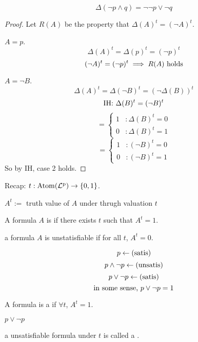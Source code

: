 \documentclass[12pt]{article}
\begin{document}
\bboxex
{}
\[\Delta(\neg p\wedge q)=\neg\neg p\vee\neg q\]
\ebox

\bboxproof
\begin{proof}
  Let \(R(A)\) be the property that \(\Delta(A)^t=(\neg A)^t\). 

   \(A=p\).
  \[\Delta(A)^t=\Delta(p)^t=(\neg p)^t\]
  \[(\neg A)^t=(\neg p)^t\implies R(A)\text{ holds}\]

   \(A=\neg B\).
  \[\Delta(A)^t=\Delta(\neg B)^t=(\neg\Delta(B))^t\]
  \[\text{IH: }\Delta(B)^t=(\neg B)^t\]
  \[=\begin{cases}
    1&:\Delta(B)^t=0\\
    0&:\Delta(B)^t=1
  \end{cases}
  \]
  \[=\begin{cases}
    1&:(\neg B)^t=0\\
    0&:(\neg B)^t=1
  \end{cases}\]
  So by IH, case 2 holds.
\end{proof}
\ebox

Recap: \(t:\mathrm{Atom}(\mathrm{\mathcal{L}^p_{}})\to\{0,1\}\).

\(A^t:=\) truth value of \(A\) under thrugh valuation \(t\)

\bbox
\begin{defn}\label{defn:satisfiable_under_t}
  A formula \(A\) is  if there exists \(t\) such that 
  \(A^t=1\).
\end{defn}
\ebox

\bbox
\begin{defn}[Unsatisfiable]\label{defn:unsatisfiable}
  a formula \(A\) is unstatisfiable if for all \(t\), \(A^t=0\).
\end{defn}
\ebox

\bboxex
\begin{exam}
  \[p\leftarrow(\mathrm{satis})\]
  \[p\wedge\neg p\leftarrow(\mathrm{unsatis})\]
  \[p\vee \neg p\leftarrow(\mathrm{satis})\]
  \[\text{in some sense, }p\vee\neg p=1\]
\end{exam}
\ebox

\bbox
\begin{defn}[Tautology]\label{defn:tautology}
  A formula is a  if \(\forall t\), \(A^t=1\).
  \bboxex
  \begin{exam}
    \(p\vee\neg p\)
  \end{exam}
  \ebox
  \bboxnote
  \begin{nota}
    a unsatisfiable formula under \(t\) is called a .
  \end{nota}
  \ebox
\end{defn}
\ebox
\end{document}
